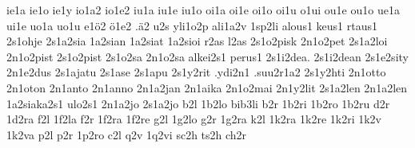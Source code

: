{ie1a
ie1o
ie1y
io1a2
io1e2
iu1a
iu1e
iu1o
oi1a
oi1e
oi1o
oi1u
o1ui %
ou1e
ou1o
ue1a
ui1e
uo1a
uo1u
e1^^f62
^^f61e2
.^^e42     %
%
%
u2s         %
yli1o2p     %
ali1a2v     %
1sp2li      %
alous1
keus1       %
rtaus1
2s1ohje     %
2s1a2sia    %
1a2sian     %
1a2siat     %
1a2sioi     %
r2as l2as   %
2s1o2pisk   %
2n1o2pet
2s1a2loi
2n1o2pist    %
2s1o2pist
2s1o2sa      %
2n1o2sa      %
alkei2s1
perus1
2s1i2dea. 2s1i2dean
2s1e2sity    %
2n1e2dus     %
2s1ajatu     %
2s1ase
2s1apu
2s1y2rit     %
.ydi2n1
.suu2r1a2    %
2s1y2hti
2n1otto 2n1oton
2n1anto 2n1anno
2n1a2jan 2n1aika
2n1o2mai
2n1y2lit
2s1a2len
2n1a2len
1a2siaka2s1
ulo2s1        %
2n1a2jo       %
2s1a2jo
%
%
%
b2l 1b2lo bib3li
b2r 1b2ri 1b2ro 1b2ru
d2r 1d2ra
f2l 1f2la
f2r 1f2ra 1f2re
g2l 1g2lo
g2r 1g2ra
k2l
1k2ra 1k2re 1k2ri
1k2v 1k2va
p2l
p2r 1p2ro
c2l
q2v 1q2vi
sc2h ts2h
ch2r
}

